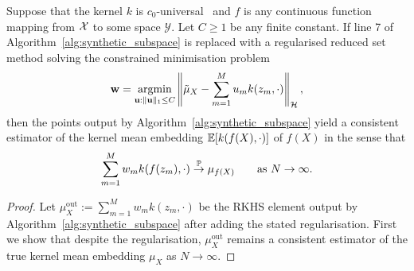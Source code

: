 \begin{theorem}
	\label{thm:synthetic_subspace_regularization_consistency}
	Suppose that the kernel $k$ is $c_0$-universal~\cite{sriperumbudur_universality_2011} and $f$ is any continuous function mapping from $\mathcal{X}$ to some space $\mathcal{Y}$. Let $C \geq 1$ be any finite constant. If line
	7
	of Algorithm~\ref{alg:synthetic_subspace} is replaced with a regularised reduced set method solving the constrained minimisation problem
	\begin{equation}
	\mathbf{w}
	=
	\operatorname*{argmin}_{\mathbf{u}: \| \mathbf{u} \|_1 \leq C}
	\left\|
	\tilde{\mu}_X
	-
	\sum_{m = 1}^M u_m k(z_m, \cdot)
	\right\|_{\mathcal{H}}
	,
	\label{eq:synthetic_subspace_regularized_minimization}
	\end{equation}
	then the points output by Algorithm~\ref{alg:synthetic_subspace} yield a consistent estimator of the kernel mean embedding $\mathbb{E}[k(f(X), \cdot)]$ of $f(X)$ in the sense that
	\begin{equation}
	\sum_{m = 1}^M w_m k(f(z_m), \cdot)
	\stackrel{\mathbb{P}}{\to}
	\mu_{f(X)}
	\hspace{2em} \text{as } N \to \infty
	.
	\end{equation}
	\begin{proof}
		Let ${\mu}_X^{\text{out}} := \sum_{m = 1}^M w_m k(z_m, \cdot)$ be the RKHS element output by Algorithm~\ref{alg:synthetic_subspace} after adding the stated regularisation. First we show that despite the regularisation, ${\mu}_X^{\text{out}}$ remains a consistent estimator of the true kernel mean embedding $\mu_X$ as $N \to \infty$.
		

\end{proof}
\end{theorem}
